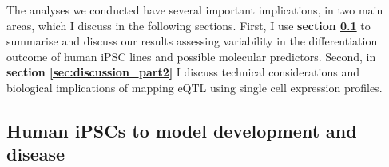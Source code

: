 

The analyses we conducted have several important implications, in two main areas, which I discuss in the following sections.
First, I use \textbf{section \ref{sec:discussion_part1}} to summarise and discuss our results assessing variability in the differentiation outcome of human iPSC lines and possible molecular predictors.
Second, in \textbf{section \ref{sec:discussion_part2}} I discuss technical considerations and biological implications of mapping eQTL using single cell expression profiles.

\subsection{Human iPSCs to model development and disease}
\label{sec:discussion_part1}

